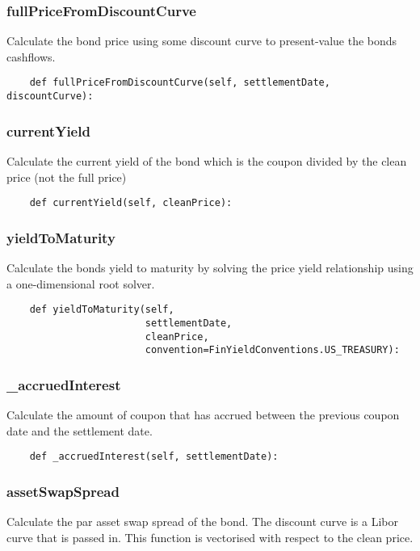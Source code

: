 \documentclass[twoside,11pt]{book}
\begin{document}
\subsubsection*{{\bf fullPriceFromDiscountCurve}}
Calculate the bond price using some discount curve to present-value the bonds cashflows.  

\begin{lstlisting}
    def fullPriceFromDiscountCurve(self, settlementDate, discountCurve):
\end{lstlisting}

\subsubsection*{{\bf currentYield}}
Calculate the current yield of the bond which is the coupon divided by the clean price (not the full price) 

\begin{lstlisting}
    def currentYield(self, cleanPrice):
\end{lstlisting}

\subsubsection*{{\bf yieldToMaturity}}
Calculate the bonds yield to maturity by solving the price yield relationship using a one-dimensional root solver.  

\begin{lstlisting}
    def yieldToMaturity(self,
                        settlementDate,
                        cleanPrice,
                        convention=FinYieldConventions.US_TREASURY):
\end{lstlisting}

\subsubsection*{{\bf \_accruedInterest}}
Calculate the amount of coupon that has accrued between the previous coupon date and the settlement date.  

\begin{lstlisting}
    def _accruedInterest(self, settlementDate):
\end{lstlisting}

\subsubsection*{{\bf assetSwapSpread}}
Calculate the par asset swap spread of the bond. The discount curve is a Libor curve that is passed in. This function is vectorised with respect to the clean price.  
\end{document}

